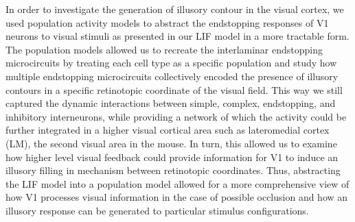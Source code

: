 \documentclass[12pt]{article}
\begin{document}
In order to investigate the generation of illusory contour in the visual cortex, we used population activity models to abstract the endstopping responses of V1 neurons to visual stimuli as presented in our LIF model in a more tractable form. The population models allowed us to recreate the interlaminar endstopping microcircuits by treating each cell type as a specific population and study how multiple endstopping microcircuits collectively encoded the presence of illusory contours in a specific retinotopic coordinate of the visual field. This way we still captured the dynamic interactions between simple, complex, endstopping, and inhibitory interneurons, while providing a network of which the activity could be further integrated in a higher visual cortical area such as lateromedial cortex (LM), the second visual area in the mouse. In turn, this allowed us to examine how higher level visual feedback could provide information for V1 to induce an illusory filling in mechanism between retinotopic coordinates. Thus, abstracting the LIF model into a population model allowed for a more comprehensive view of how V1 processes visual information in the case of possible occlusion and how an illusory response can be generated to particular stimulus configurations.
\end{document}

